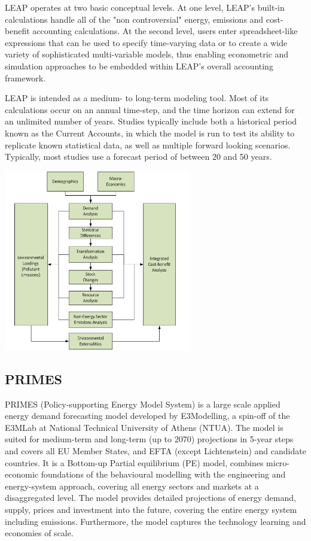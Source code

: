 \documentclass[lettersize,journal]{IEEEtran}
\begin{document}
  LEAP operates at two basic conceptual levels. At one level, LEAP's built-in calculations handle all of the "non controversial" energy, emissions and cost-benefit accounting calculations. At the second level, users enter spreadsheet-like expressions that can be used to specify time-varying data or to create a wide variety of sophisticated multi-variable models, thus enabling econometric and simulation approaches to be embedded within LEAP’s overall accounting framework.
 
  LEAP  is intended as a medium- to long-term modeling tool. Most of its calculations occur on an annual time-step, and the time horizon can extend for an unlimited number of years. Studies typically include both a historical period known as the Current Accounts, in which the model is run to test its ability to replicate known statistical data, as well as multiple forward looking scenarios. Typically, most studies use a forecast period of between 20 and 50 years.\cite{leap}
 
  \includegraphics[width=3.2in]{leapstructure.png}

  \subsection{PRIMES}
  PRIMES (Policy-supporting Energy Model System) is a large scale applied energy demand forecasting model developed by E3Modelling, a spin-off of the E3MLab at National Technical University of Athens (NTUA). The model is suited for medium-term and long-term (up to 2070) projections in 5-year steps and covers all EU Member States, and EFTA (except Lichtenstein) and candidate countries. It is a Bottom-up Partial equilibrium (PE) model, combines micro-economic foundations of the behavioural modelling with the engineering and energy-system approach, covering all energy sectors and markets at a disaggregated level. The model provides detailed projections of energy demand, supply, prices and investment into the future, covering the entire energy system including emissions. Furthermore, the model captures the technology learning and economies of scale.
\end{document}
